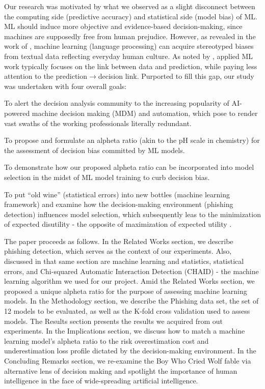 \documentclass[deca,blindrev]{informs3}
\begin{document}
Our research was motivated by what we observed as a slight disconnect between the computing side (predictive accuracy) and statistical side (model bias) of ML. ML should induce  more objective and evidence-based decision-making, since machines are supposedly free from human prejudice. However, as revealed in the work of \cite{Caliskan2017},  machine learning (language processing) can acquire stereotyped biases from textual data reflecting everyday human culture. As noted by \cite{Kleinberg2017}, applied ML work typically focuses on the link between data and prediction, while paying less attention to the prediction$\to$decision link.
 Purported to fill this gap, our study was undertaken with four overall goals:

\begin{henumerate}
\item To alert the decision analysis  community to the increasing popularity of AI-powered  machine decision making (MDM) and automation, which pose to render vast swaths of the working professionals literally redundant.

\item To propose and formulate an  alpheta ratio (akin to the pH scale in chemistry) for the assessment of decision bias committed by  ML  models.
\item To demonstrate how our proposed alpheta ratio can be incorporated into model selection in the midst of ML model training to curb decision bias. 
\item To put “old wine” (statistical errors) into new bottles (machine learning framework) and examine how the decision-making environment (phishing detection) influences model selection, which subsequently leas to the minimization of expected disutility - the opposite of maximization of expected utility .
\end{henumerate}

The paper proceeds as follows. In the Related Works section, we describe phishing detection, which serves as the context of our experiments. Also, discussed in that same section are machine learning and statistics, statistical errors, and Chi-squared Automatic Interaction Detection (CHAID) - the machine learning algorithm we used for our project. Amid the Related Works section, we proposed a unique  alpheta ratio for the purpose of assessing machine learning models. In the Methodology section, we describe the Phishing data set, the set of 12 models to be evaluated, as well as the K-fold cross validation used to assess models. The Results section presents the results we acquired from out experiments. In the Implications section, we discuss how to match a machine learning model’s  alpheta  ratio to the risk overestimation cost and underestimation loss profile dictated by the decision-making environment. In the Concluding Remarks section, we re-examine the Boy Who Cried Wolf fable via alternative lens of decision making and spotlight the importance of human intelligence in the face of wide-spreading artificial intelligence. 
\end{document}
